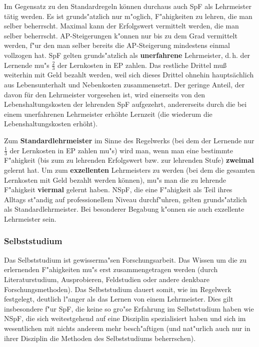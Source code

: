 \documentclass[10pt,a4paper,germanpar]{article}
\begin{document}
Im Gegensatz zu den Standardregeln können durchaus auch SpF als
Lehrmeister tätig werden. Es ist grunds"atzlich nur m"oglich,
F"ahigkeiten zu lehren, die man selber beherrscht. Maximal kann der
Erfolgswert vermittelt werden, die man selber beherrscht.
AP-Steigerungen k"onnen nur bis zu dem Grad vermittelt werden, f"ur
den man selber bereits die AP-Steigerung mindestens einmal vollzogen
hat. SpF gelten grunds"atzlich als \textbf{unerfahrene} Lehrmeister,
d.\,h. der Lernende mu"s $\frac{2}{3}$ der Lernkosten in EP
zahlen. Das restliche Drittel muß weiterhin mit Geld bezahlt werden,
weil sich dieses Drittel ohnehin hauptsächlich aus Lebensunterhalt und
Nebenkosten zusammensetzt. Der geringe Anteil, der davon für den
Lehrmeister vorgesehen ist, wird einerseits von den
Lebenshaltungskosten der lehrenden SpF aufgezehrt, andererseits durch
die bei einem unerfahrenen Lehrmeister erhöhte Lernzeit (die wiederum
die Lebenshaltungskosten erhöht).

Zum \textbf{Standardlehrmeister} im Sinne des Regelwerks (bei dem der
Lernende nur $\frac{1}{3}$ der Lernkosten in EP zahlen mu"s)
wird man, wenn man eine bestimmte F"ahigkeit (bis zum zu lehrenden
Erfolgswert bzw. zur lehrenden Stufe) \textbf{zweimal} gelernt hat. Um
zum \textbf{exzellenten} Lehrmeisters zu werden (bei dem die gesamten
Lernkosten mit Geld bezahlt werden können), mu"s man die zu lehrende
F"ahigkeit \textbf{viermal} gelernt haben. NSpF, die eine F"ahigkeit
als Teil ihres Alltags st"andig auf professionellem Niveau
durchf"uhren, gelten grunds"atzlich als Standardlehrmeister. Bei
besonderer Begabung k"onnen sie auch exzellente Lehrmeister sein.

\subsubsection{Selbststudium}
\label{selbststudium}

Das Selbststudium ist gewisserma"sen Forschungsarbeit. Das Wissen um
die zu erlernenden F"ahigkeiten mu"s erst zusammengetragen werden
(durch Literaturstudium, Ausprobieren, Feldstudien oder andere
denkbare Forschungsmethoden). Das Selbststudium dauert somit, wie im
Regelwerk festgelegt, deutlich l"anger als das Lernen von einem
Lehrmeister. Dies gilt insbesondere f"ur SpF, die keine so gro"se
Erfahrung im Selbststudium haben wie NSpF, die sich weitestgehend auf
eine Disziplin spezialisiert haben und sich im wesentlichen mit nichts
anderem mehr besch"aftigen (und nat"urlich auch nur in ihrer Disziplin
die Methoden des Selbststudiums beherrschen).
\end{document}
